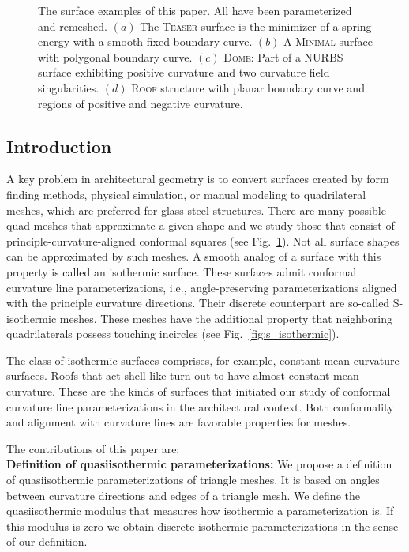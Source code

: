 \begin{figure}
\centering
\resizebox{\linewidth}{!}{}
\caption{The surface examples of this paper. All have been parameterized and
remeshed. $(a)$ The \textsc{Teaser} surface is the minimizer of a spring energy
with a smooth fixed boundary curve. $(b)$ A \textsc{Minimal} surface with
polygonal boundary curve. $(c)$ \textsc{Dome}: Part of a NURBS surface
exhibiting positive curvature and two curvature field singularities. $(d)$
\textsc{Roof} structure with planar boundary curve and regions of positive and
negative curvature.} 
\label{fig:all_mesh}
\end{figure}

\subsection{Introduction}
A key problem in architectural geometry is to convert surfaces created by form
finding methods, physical simulation, or manual modeling to quadrilateral
meshes, which are preferred for glass-steel structures. There are many 
possible quad-meshes that approximate a given shape and we study those that consist
of principle-curvature-aligned conformal squares (see Fig.~\ref{fig:all_mesh}). 
Not all surface shapes can be approximated by such meshes. A smooth analog of
a surface with this property is called an isothermic surface. These surfaces admit conformal
curvature line parameterizations, i.e., angle-preserving parameterizations
aligned with the principle curvature directions. Their discrete counterpart are 
so-called S-isothermic meshes. These meshes have the additional property that
neighboring quadrilaterals possess touching incircles (see
Fig.~\ref{fig:s_isothermic}).  

The class of isothermic surfaces comprises, for example, constant mean
curvature surfaces. Roofs that act shell-like turn out to have almost constant
mean curvature. These are the kinds of surfaces that initiated our study of
conformal curvature line parameterizations in the architectural context. Both
conformality and alignment with curvature lines are favorable
properties for meshes. 

\noindent The contributions of this paper are:\\
\noindent\textbf{Definition of quasiisothermic parameterizations:} 
We propose a definition of quasiisothermic parameterizations of triangle meshes. 
It is based on angles between curvature directions and edges of a triangle mesh.
We define the quasiisothermic modulus that measures how isothermic a 
parameterization is. If this modulus is zero we obtain discrete isothermic 
parameterizations in the sense of our definition.

